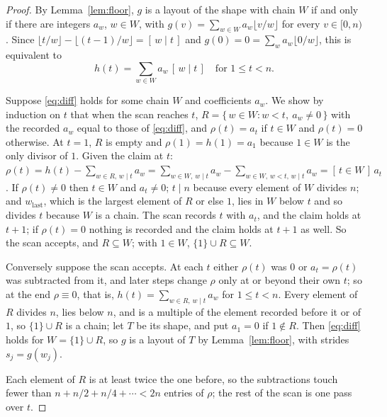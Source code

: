 \documentclass[11pt]{article}
\theoremstyle{definition}
\begin{document}
\begin{proof}
By Lemma~\ref{lem:floor}, $g$ is a layout of the shape with chain $W$ if
and only if there are integers $a_w$, $w \in W$, with
$g(v) = \sum_{w \in W} a_w \lfloor v/w \rfloor$ for every $v \in [0,n)$.
Since $\lfloor t/w \rfloor - \lfloor (t-1)/w \rfloor = [\,w \mid t\,]$ and
$g(0) = 0 = \sum_{w} a_w \lfloor 0/w \rfloor$, this is equivalent to
\begin{equation}\label{eq:diff}
h(t) = \sum_{w \in W} a_w\, [\,w \mid t\,] \quad\text{for } 1 \le t < n.
\end{equation}

Suppose \eqref{eq:diff} holds for some chain $W$ and coefficients $a_w$. We
show by induction on $t$ that when the scan reaches $t$,
$R = \{\, w \in W : w < t,\ a_w \ne 0 \,\}$ with the recorded $a_w$ equal
to those of \eqref{eq:diff}, and $\rho(t) = a_t$ if $t \in W$ and
$\rho(t) = 0$ otherwise. At $t = 1$, $R$ is empty and $\rho(1) = h(1) =
a_1$ because $1 \in W$ is the only divisor of $1$. Given the claim at $t$:
$\rho(t) = h(t) - \sum_{w \in R,\, w \mid t} a_w = \sum_{w \in W,\, w \mid t}
a_w - \sum_{w \in W,\, w < t,\, w \mid t} a_w = [\,t \in W\,]\, a_t$. If
$\rho(t) \ne 0$ then $t \in W$ and $a_t \ne 0$; $t \mid n$ because every
element of $W$ divides $n$; and $w_{\mathrm{last}}$, which is the largest
element of $R$ or else $1$, lies in $W$ below $t$ and so divides $t$
because $W$ is a chain. The scan records $t$ with $a_t$, and the claim
holds at $t+1$; if $\rho(t) = 0$ nothing is recorded and the claim holds at
$t+1$ as well. So the scan accepts, and $R \subseteq W$; with $1 \in W$,
$\{1\} \cup R \subseteq W$.

Conversely suppose the scan accepts. At each $t$ either $\rho(t)$ was $0$
or $a_t = \rho(t)$ was subtracted from it, and later steps change $\rho$
only at or beyond their own $t$; so at the end $\rho \equiv 0$, that is,
$h(t) = \sum_{w \in R,\, w \mid t} a_w$ for $1 \le t < n$. Every element of
$R$ divides $n$, lies below $n$, and is a multiple of the element recorded
before it or of $1$, so $\{1\} \cup R$ is a chain; let $T$ be its shape,
and put $a_1 = 0$ if $1 \notin R$. Then \eqref{eq:diff} holds for
$W = \{1\} \cup R$, so $g$ is a layout of $T$ by Lemma~\ref{lem:floor}, with
strides $s_j = g(w_j)$.

Each element of $R$ is at least twice the one before, so the subtractions
touch fewer than $n + n/2 + n/4 + \cdots < 2n$ entries of $\rho$; the rest
of the scan is one pass over $t$.
\end{proof}
\end{document}
